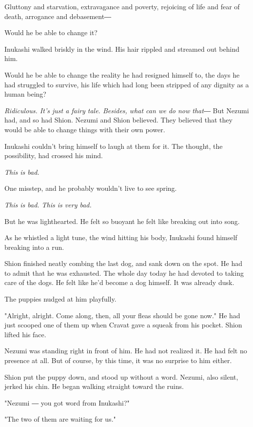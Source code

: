 Gluttony and starvation, extravagance and poverty, rejoicing of life and
fear of death, arrogance and debasement―

Would he be able to change it?

Inukashi walked briskly in the wind. His hair rippled and streamed out
behind him.

Would he be able to change the reality he had resigned himself to, the
days he had struggled to survive, his life which had long been stripped
of any dignity as a human being?

\emph{Ridiculous. It's just a fairy tale. Besides, what can we do now that―}
But Nezumi had, and so had Shion. Nezumi and Shion believed. They
believed that they would be able to change things with their own power.

Inukashi couldn't bring himself to laugh at them for it. The thought,
the possibility, had crossed his mind.

\emph{This is bad.}

One misstep, and he probably wouldn't live to see spring.

\emph{This is bad. This is very bad.}

But he was lighthearted. He felt so buoyant he felt like breaking out
into song.

As he whistled a light tune, the wind hitting his body, Inukashi found
himself breaking into a run.

\myspace

Shion finished neatly combing the last dog, and sank down on the spot.
He had to admit that he was exhausted. The whole day today he had
devoted to taking care of the dogs. He felt like he'd become a dog
himself. It was already dusk.

The puppies nudged at him playfully.

"Alright, alright. Come along, then, all your fleas should be gone now."
He had just scooped one of them up when Cravat gave a squeak from his
pocket. Shion lifted his face.

Nezumi was standing right in front of him. He had not realized it. He
had felt no presence at all. But of course, by this time, it was no
surprise to him either.

Shion put the puppy down, and stood up without a word. Nezumi, also
silent, jerked his chin. He began walking straight toward the ruins.

"Nezumi ― you got word from Inukashi?"

"The two of them are waiting for us."

